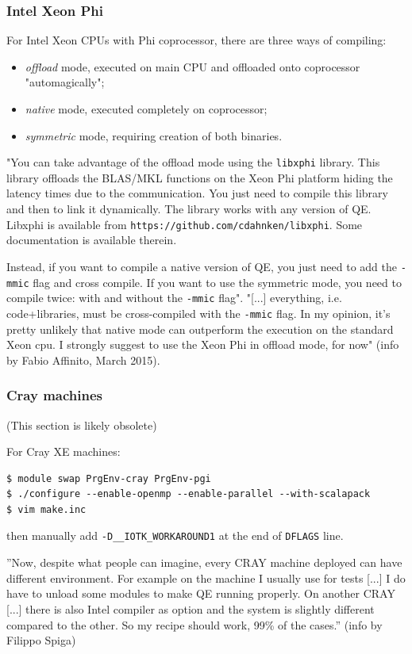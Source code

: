 \documentclass[12pt,a4paper]{article}
\begin{document}
\subsubsection{Intel Xeon Phi}
For Intel Xeon CPUs with Phi coprocessor, there are three ways of compiling:
\begin{itemize}
\item {\em offload} mode, executed on main CPU and offloaded onto coprocessor
"automagically";
\item {\em native} mode, executed completely on coprocessor;
\item {\em symmetric} mode, requiring creation of both binaries.
\end{itemize}
"You can take advantage of the offload mode using the \texttt{libxphi}
library. This library offloads the BLAS/MKL functions on the Xeon Phi
platform hiding the latency times due to the communication. You just
need to compile this library and then to link it dynamically. The
library works with any version of QE. Libxphi is available from
\texttt{https://github.com/cdahnken/libxphi}. Some documentation is
available therein.

Instead, if you want to compile a native version of QE, you just need
to add the \texttt{-mmic} flag and cross compile. If you want to use
the symmetric mode, you need to compile twice: with and without the
\texttt{-mmic} flag". "[...] everything, i.e. code+libraries, must be
cross-compiled with the \texttt{-mmic} flag. In my opinion, it's pretty
unlikely that native mode can outperform the execution on the standard
Xeon cpu. I strongly suggest to use the Xeon Phi in offload mode, for now"
(info by Fabio Affinito, March 2015).

\subsubsection{Cray machines}

(This section is likely obsolete)

For Cray XE machines:
\begin{verbatim}
$ module swap PrgEnv-cray PrgEnv-pgi
$ ./configure --enable-openmp --enable-parallel --with-scalapack
$ vim make.inc
\end{verbatim}
then manually add \texttt{-D\_\_IOTK\_WORKAROUND1} at the end of \texttt{DFLAGS} line.

''Now, despite what people can imagine, every CRAY machine deployed can
have different environment. For example on the machine I usually use
for tests [...] I do have to unload some modules to make QE running
properly. On another CRAY [...] there is also Intel compiler as option
and the system is slightly different compared to the other.
So my recipe should work, 99\% of the cases.'' (info by Filippo Spiga)
\end{document}
